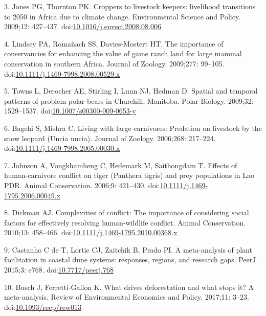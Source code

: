 \documentclass[10pt,letterpaper]{article}
\begin{document}
\hypertarget{ref-Jones2009}{}
3. Jones PG, Thornton PK. Croppers to livestock keepers: livelihood
transitions to 2050 in Africa due to climate change. Environmental
Science and Policy. 2009;12: 427--437.
doi:\href{https://doi.org/10.1016/j.envsci.2008.08.006}{10.1016/j.envsci.2008.08.006}

\hypertarget{ref-Lindsey2009}{}
4. Lindsey PA, Romañach SS, Davies-Mostert HT. The importance of
conservancies for enhancing the value of game ranch land for large
mammal conservation in southern Africa. Journal of Zoology. 2009;277:
99--105.
doi:\href{https://doi.org/10.1111/j.1469-7998.2008.00529.x}{10.1111/j.1469-7998.2008.00529.x}

\hypertarget{ref-Towns2009}{}
5. Towns L, Derocher AE, Stirling I, Lunn NJ, Hedman D. Spatial and
temporal patterns of problem polar bears in Churchill, Manitoba. Polar
Biology. 2009;32: 1529--1537.
doi:\href{https://doi.org/10.1007/s00300-009-0653-y}{10.1007/s00300-009-0653-y}

\hypertarget{ref-Bagchi2006}{}
6. Bagchi S, Mishra C. Living with large carnivores: Predation on
livestock by the snow leopard (Uncia uncia). Journal of Zoology.
2006;268: 217--224.
doi:\href{https://doi.org/10.1111/j.1469-7998.2005.00030.x}{10.1111/j.1469-7998.2005.00030.x}

\hypertarget{ref-Johnson2006}{}
7. Johnson A, Vongkhamheng C, Hedemark M, Saithongdam T. Effects of
human-carnivore conflict on tiger (Panthera tigris) and prey populations
in Lao PDR. Animal Conservation. 2006;9: 421--430.
doi:\href{https://doi.org/10.1111/j.1469-1795.2006.00049.x}{10.1111/j.1469-1795.2006.00049.x}

\hypertarget{ref-Dickman2010}{}
8. Dickman AJ. Complexities of conflict: The importance of considering
social factors for effectively resolving human-wildlife conflict. Animal
Conservation. 2010;13: 458--466.
doi:\href{https://doi.org/10.1111/j.1469-1795.2010.00368.x}{10.1111/j.1469-1795.2010.00368.x}

\hypertarget{ref-Castanho2015}{}
9. Castanho C de T, Lortie CJ, Zaitchik B, Prado PI. A meta-analysis of
plant facilitation in coastal dune systems: responses, regions, and
research gaps. PeerJ. 2015;3: e768.
doi:\href{https://doi.org/10.7717/peerj.768}{10.7717/peerj.768}

\hypertarget{ref-Busch2017}{}
10. Busch J, Ferretti-Gallon K. What drives deforestation and what stops
it? A meta-analysis. Review of Environmental Economics and Policy.
2017;11: 3--23.
doi:\href{https://doi.org/10.1093/reep/rew013}{10.1093/reep/rew013}
\end{document}
